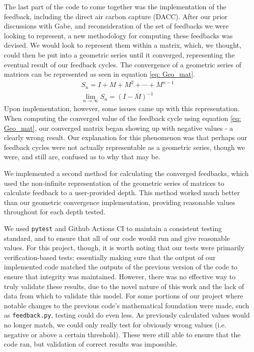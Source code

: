 \documentclass{article}
\begin{document}
The last part of the code to come together was the implementation of the feedback, including the direct air carbon capture (DACC). After our prior discussions with Gabe, and reconsideration of the set of feedbacks we were looking to represent, a new methodology for computing these feedbacks was devised. We would look to represent them within a matrix, which, we thought, could then be put into a geometric series until it converged, representing the eventual result of our feedback cycles. The convergence of a geometric series of matrices can be represented as seen in equation \ref{eq: Geo_mat}.
\begin{equation}\label{eq: Geo_mat}
\begin{aligned}
    S_n = I + M + M^2 + \cdots + M^{n-1}\\
    \lim_{n\rightarrow\infty} S_n = (I - M)^{-1}
\end{aligned}
\end{equation}
Upon implementation, however, some issues came up with this representation. When computing the converged value of the feedback cycle using equation \ref{eq: Geo_mat}, our converged matrix began showing up with negative values - a clearly wrong result. Our explanation for this phenomenon was that perhaps our feedback cycles were not actually representable as a geometric series, though we were, and still are, confused as to why that may be.

We implemented a second method for calculating the converged feedbacks, which used the non-infinite representation of the geometric series of matrices to calculate feedback to a user-provided depth. This method worked much better than our geometric convergence implementation, providing reasonable values throughout for each depth tested.

We used \texttt{pytest} and Github Actions CI to maintain a consistent testing standard, and to ensure that all of our code would run and give reasonable values. For this project, though, it is worth noting that our tests were primarily verification-based tests: essentially making sure that the output of our implemented code matched the outputs of the previous version of the code to ensure that integrity was maintained. However, there was no effective way to truly validate these results, due to the novel nature of this work and the lack of data from which to validate this model. For some portions of our project where notable changes to the previous code's mathematical foundation were made, such as \texttt{feedback.py}, testing could do even less. As previously calculated values would no longer match, we could only really test for obviously wrong values (i.e. negative or above a certain threshold). These were still able to ensure that the code ran, but validation of correct results was impossible.
\end{document}
